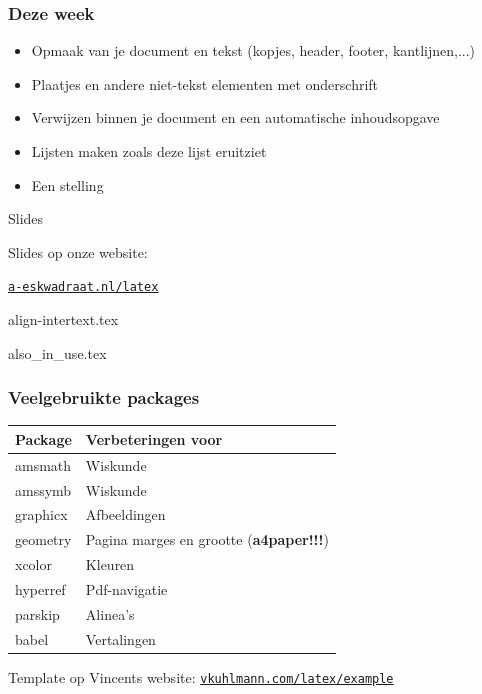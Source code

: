 \documentclass{cursuspresentatie}
\def\importslide#1#2{%
	{#2}
}
\begin{document}
\begin{frame}
\frametitle{Deze week}
\begin{itemize}
    \item Opmaak van je document en tekst (kopjes, header, footer, kantlijnen,...)
    \item Plaatjes en andere niet-tekst elementen met onderschrift
    \item Verwijzen binnen je document en een automatische inhoudsopgave
    \item Lijsten maken zoals deze lijst eruitziet
    \item Een stelling
\end{itemize}
\end{frame}

\begin{frame}{Slides}
    \begin{center}
        \huge Slides op onze website:

        \bigskip

        \huge
        \href{https://www.a-eskwadraat.nl/latex}{\ul{\texttt{a-eskwadraat.nl/latex}}}
    \end{center}
\end{frame}


\importslide{math}{align-intertext.tex}
\importslide{math}{also_in_use.tex}


\begin{frame}
	\frametitle{Veelgebruikte packages}

	\begin{tabularx}{\textwidth}{X l}
		\toprule
		Package & Verbeteringen voor\\
		\midrule
		amsmath & Wiskunde \\
		amssymb & Wiskunde \\
		graphicx & Afbeeldingen \\
		geometry & Pagina marges en grootte (\textbf{a4paper!!!})\\
		xcolor & Kleuren \\
		hyperref & Pdf-navigatie \\
		parskip & Alinea's\\
		babel & Vertalingen\\
		\bottomrule
	\end{tabularx}
	\medskip

	Template op Vincents website: \href{https://vkuhlmann.com/latex/example}{\ul{\texttt{vkuhlmann.com/latex/example}}}
\end{frame}
\end{document}

